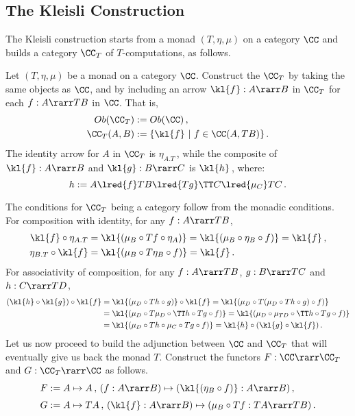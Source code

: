 \documentclass{svmult}
\begin{document}
\subsection{The Kleisli Construction}
%
The Kleisli construction starts from a monad $(T,\eta,\mu)$ on a category $\CC$ and builds a category $\CC_T$ of $T$-computations, as follows.
\begin{mydefinition}
Let $(T,\eta,\mu)$ be a monad on a category $\CC$. Construct the  $\CC_T$ by taking the same objects as $\CC$, and by
including an arrow $\kl{f}:A\rarr B$ in $\CC_T$ for each $f:A\rarr TB$ in $\CC$. That is,
\begin{align*}
  Ob(\CC_T) &:= Ob(\CC)\,, \\
  \CC_T(A,B) &:= \{ \kl{f}\ |\ f\in\CC(A,TB)\}\,.
\end{align*}
The identity arrow for $A$ in $\CC_T$ is $\eta_{A.T}$\,, while the composite of $\kl{f}:A\rarr B$ and $\kl{g}:B\rarr C$ is $\kl{h}$\,, where:
\[ h := A\lred{f}TB\lred{Tg}\TT C\lred{\mu_C}TC\,. \]
\deq[-1]
\end{mydefinition}
%
The conditions for $\CC_T$ being a category follow from the monadic conditions. For composition with identity, for any $f:A\rarr TB$,
%
\begin{align*}
    \kl{f}\circ\eta_{A.T} &= \kl{(\mu_B\circ Tf\circ\eta_A)} = \kl{(\mu_B\circ\eta_B\circ f)}=\kl{f}\,,  \\
    \eta_{B.T}\circ\kl{f} &= \kl{(\mu_B\circ T\eta_B\circ f)} = \kl{f}\,.
\end{align*}
%
For associativity of composition, for any $f:A\rarr TB$, $g:B\rarr TC$ and $h:C\rarr TD$,
\begin{align*}
  (\kl{h}\circ\kl{g})\circ\kl{f} &= \kl{(\mu_D\circ Th\circ g)}\circ\kl{f} = \kl{(\mu_D\circ T(\mu_D\circ Th\circ g)\circ f)} \\
    &= \kl{(\mu_D\circ T\mu_D\circ \TT h\circ Tg\circ f)} = \kl{(\mu_D\circ \mu_{TD}\circ \TT h\circ Tg\circ f)}\\
    &= \kl{(\mu_D\circ Th\circ\mu_C\circ Tg\circ f)} = \kl{h}\circ(\kl{g}\circ\kl{f})\,.
\end{align*}
%
%
Let us now proceed to build the adjunction between $\CC$ and $\CC_T$ that will eventually give us back the monad $T$. Construct the functors
$F:\CC\rarr\CC_T$ and $G:\CC_T\rarr\CC$ as follows.
\begin{align*}
  F&:= A\mapsto A\,,\, (f:A\rarr B) \mapsto (\kl{(\eta_B\circ f)}:A\rarr B)\,, \\[1mm]
  G&:= A\mapsto TA\,,\, (\kl{f}:A\rarr B) \mapsto (\mu_B\circ Tf:TA\rarr TB)\,.
\end{align*}
\end{document}

